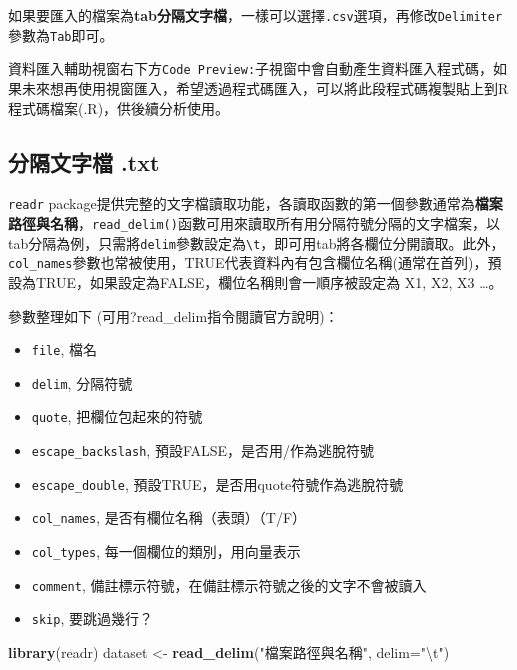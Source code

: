 \documentclass[]{book}
\newenvironment{Shaded}{\begin{snugshade}}{\end{snugshade}}
\newcommand{\KeywordTok}[1]{\textcolor[rgb]{0.13,0.29,0.53}{\textbf{{#1}}}}
\newcommand{\DataTypeTok}[1]{\textcolor[rgb]{0.13,0.29,0.53}{{#1}}}
\newcommand{\CharTok}[1]{\textcolor[rgb]{0.31,0.60,0.02}{{#1}}}
\newcommand{\StringTok}[1]{\textcolor[rgb]{0.31,0.60,0.02}{{#1}}}
\newcommand{\NormalTok}[1]{{#1}}
\providecommand{\tightlist}{%
  \setlength{\itemsep}{0pt}\setlength{\parskip}{0pt}}
\theoremstyle{definition}
\theoremstyle{definition}
\theoremstyle{remark}
\begin{document}
如果要匯入的檔案為\textbf{tab分隔文字檔}，一樣可以選擇\texttt{.csv}選項，再修改\texttt{Delimiter}參數為\texttt{Tab}即可。

資料匯入輔助視窗右下方\texttt{Code\ Preview:}子視窗中會自動產生資料匯入程式碼，如果未來想再使用視窗匯入，希望透過程式碼匯入，可以將此段程式碼複製貼上到R程式碼檔案(.R)，供後續分析使用。

\subsection{分隔文字檔 .txt}\label{-.txt}

\texttt{readr} \citep{R-readr}
package提供完整的文字檔讀取功能，各讀取函數的第一個參數通常為\textbf{檔案路徑與名稱}，\texttt{read\_delim()}函數可用來讀取所有用分隔符號分隔的文字檔案，以tab分隔為例，只需將\texttt{delim}參數設定為\texttt{\textbackslash{}t}，即可用tab將各欄位分開讀取。此外，\texttt{col\_names}參數也常被使用，TRUE代表資料內有包含欄位名稱(通常在首列)，預設為TRUE，如果設定為FALSE，欄位名稱則會一順序被設定為
X1, X2, X3 \ldots{}。

參數整理如下 (可用?read\_delim指令閱讀官方說明)：

\begin{itemize}
\tightlist
\item
  \texttt{file}, 檔名
\item
  \texttt{delim}, 分隔符號
\item
  \texttt{quote}, 把欄位包起來的符號
\item
  \texttt{escape\_backslash}, 預設FALSE，是否用/作為逃脫符號
\item
  \texttt{escape\_double}, 預設TRUE，是否用quote符號作為逃脫符號
\item
  \texttt{col\_names}, 是否有欄位名稱（表頭）（T/F）
\item
  \texttt{col\_types}, 每一個欄位的類別，用向量表示
\item
  \texttt{comment}, 備註標示符號，在備註標示符號之後的文字不會被讀入
\item
  \texttt{skip}, 要跳過幾行？
\end{itemize}

\begin{Shaded}
\begin{Highlighting}[]
\KeywordTok{library}\NormalTok{(readr)}
\NormalTok{dataset <-}\StringTok{ }\KeywordTok{read_delim}\NormalTok{(}\StringTok{"檔案路徑與名稱"}\NormalTok{, }\DataTypeTok{delim=}\StringTok{"}\CharTok{\textbackslash{}t}\StringTok{"}\NormalTok{)}
\end{Highlighting}
\end{Shaded}
\end{document}
